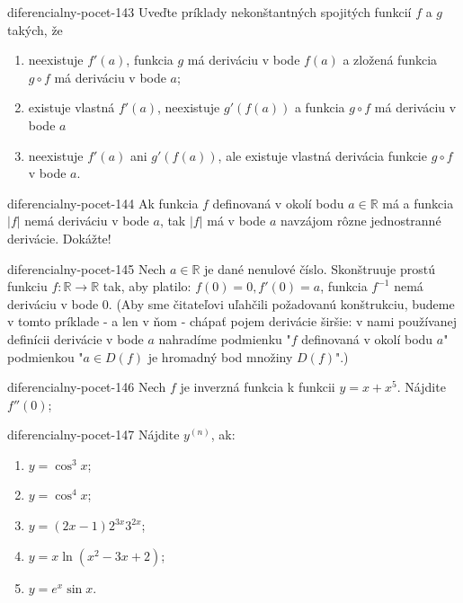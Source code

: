 \begin{defproblem}{diferencialny-pocet-143}
Uveďte príklady nekonštantných spojitých funkcií $f$ a $g$ takých, že
\begin{enumerate}
\item neexistuje $f'(a)$, funkcia $g$ má deriváciu v bode $f(a)$ a zložená funkcia $g\circ f$ má deriváciu v bode $a$;
\item existuje vlastná $f'(a)$, neexistuje $g'(f(a))$ a funkcia $g\circ f$ má deriváciu v bode $a$
\item neexistuje $f'(a)$ ani $g'(f(a))$, ale existuje vlastná derivácia funkcie $g\circ f$ v bode $a$.
\end{enumerate}
\end{defproblem}

\begin{defproblem}{diferencialny-pocet-144}
Ak funkcia $f$ definovaná v okolí bodu $a\in\mathbb{R}$ má a funkcia $|f|$ nemá deriváciu v bode $a$, tak $|f|$ má v bode $a$ navzájom rôzne jednostranné derivácie. Dokážte!
\end{defproblem}

\begin{defproblem}{diferencialny-pocet-145}
Nech $a\in\mathbb{R}$ je dané nenulové číslo. Skonštruuje prostú funkciu $f:\mathbb{R}\rightarrow\mathbb{R}$ tak, aby platilo: $f(0)=0,f'(0)=a$, funkcia $f^{-1}$ nemá deriváciu v bode $0$. (Aby sme čitateľovi uľahčili požadovanú konštrukciu, budeme v tomto príklade - a len v ňom - chápať pojem derivácie širšie: v nami používanej definícii derivácie v bode $a$ nahradíme podmienku "$f$ definovaná v okolí bodu $a$" podmienkou "$a\in D(f)$ je hromadný bod množiny $D(f)$".)
\end{defproblem}

\begin{defproblem}{diferencialny-pocet-146}
Nech $f$ je inverzná funkcia k funkcii $y=x+x^5$. Nájdite $f''(0)$;
\end{defproblem}

\begin{defproblem}{diferencialny-pocet-147}
Nájdite $y^{(n)}$, ak:
\begin{multicols}{2}
\begin{enumerate}
    \item $y=\cos^3 x$;
	\item $y=\cos^4 x$;
	\item $y=(2x-1)2^{3x}3^{2x}$;
	\item $y=x\ln (x^2-3x+2)$;
	\item $y=e^x \sin x$.
\end{enumerate}
\end{multicols}
\end{defproblem}

